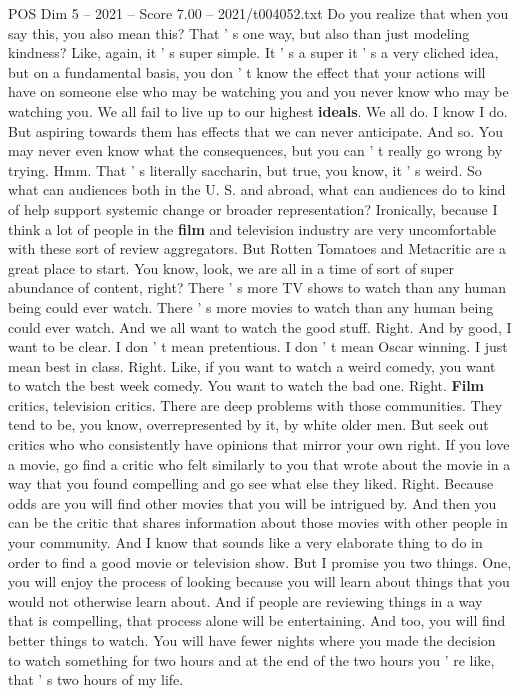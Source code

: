 \begin{textsample}{POS Dim 5 – 2021 – Score 7.00 – 2021/t004052.txt}
Do you realize that when you say this, you also mean this?
That ' s one way, but also than just modeling kindness?
Like, again, it ' s super simple.
It ' s a super it ' s a very cliched idea, but on a fundamental basis, you don ' t know the effect that your actions will have on someone else who may be watching you and you never know who may be watching you.
We all fail to live up to our highest \textbf{ideals}.
We all do.
I know I do.
But aspiring towards them has effects that we can never anticipate.
And so.
You may never even know what the consequences, but you can ' t really go wrong by trying.
Hmm.
That ' s literally saccharin, but true, you know, it ' s weird.
So what can audiences both in the U.
S. and abroad, what can audiences do to kind of help support systemic change or broader representation?
Ironically, because I think a lot of people in the \textbf{film} and television industry are very uncomfortable with these sort of review aggregators.
But Rotten Tomatoes and Metacritic are a great place to start.
You know, look, we are all in a time of sort of super abundance of content, right?
There ' s more TV shows to watch than any human being could ever watch.
There ' s more movies to watch than any human being could ever watch.
And we all want to watch the good stuff.
Right.
And by good, I want to be clear.
I don ' t mean pretentious.
I don ' t mean Oscar winning.
I just mean best in class.
Right.
Like, if you want to watch a weird comedy, you want to watch the best week comedy.
You want to watch the bad one.
Right. \textbf{Film} critics, television critics.
There are deep problems with those communities.
They tend to be, you know, overrepresented by it, by white older men.
But seek out critics who who consistently have opinions that mirror your own right.
If you love a movie, go find a critic who felt similarly to you that wrote about the movie in a way that you found compelling and go see what else they liked.
Right.
Because odds are you will find other movies that you will be intrigued by.
And then you can be the critic that shares information about those movies with other people in your community.
And I know that sounds like a very elaborate thing to do in order to find a good movie or television show.
But I promise you two things.
One, you will enjoy the process of looking because you will learn about things that you would not otherwise learn about.
And if people are reviewing things in a way that is compelling, that process alone will be entertaining.
And too, you will find better things to watch.
You will have fewer nights where you made the decision to watch something for two hours and at the end of the two hours you ' re like, that ' s two hours of my life.

\end{textsample}
